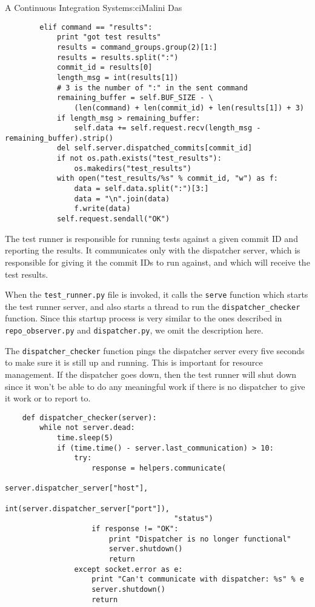 \begin{aosachapter}{A Continuous Integration System}{s:ci}{Malini Das}
\begin{verbatim}
        elif command == "results":
            print "got test results"
            results = command_groups.group(2)[1:]
            results = results.split(":")
            commit_id = results[0]
            length_msg = int(results[1])
            # 3 is the number of ":" in the sent command
            remaining_buffer = self.BUF_SIZE - \
                (len(command) + len(commit_id) + len(results[1]) + 3)
            if length_msg > remaining_buffer:
                self.data += self.request.recv(length_msg - remaining_buffer).strip()
            del self.server.dispatched_commits[commit_id]
            if not os.path.exists("test_results"):
                os.makedirs("test_results")
            with open("test_results/%s" % commit_id, "w") as f:
                data = self.data.split(":")[3:]
                data = "\n".join(data)
                f.write(data)
            self.request.sendall("OK")
\end{verbatim}

\label{the-test-runner-testux5frunner.py}

The test runner is responsible for running tests against a given commit
ID and reporting the results. It communicates only with the dispatcher
server, which is responsible for giving it the commit IDs to run
against, and which will receive the test results.

When the \texttt{test\_runner.py} file is invoked, it calls the
\texttt{serve} function which starts the test runner server, and also
starts a thread to run the \texttt{dispatcher\_checker} function. Since
this startup process is very similar to the ones described in
\texttt{repo\_observer.py} and \texttt{dispatcher.py}, we omit the
description here.

The \texttt{dispatcher\_checker} function pings the dispatcher server
every five seconds to make sure it is still up and running. This is
important for resource management. If the dispatcher goes down, then the
test runner will shut down since it won't be able to do any meaningful
work if there is no dispatcher to give it work or to report to.

\begin{verbatim}
    def dispatcher_checker(server):
        while not server.dead:
            time.sleep(5)
            if (time.time() - server.last_communication) > 10:
                try:
                    response = helpers.communicate(
                                       server.dispatcher_server["host"],
                                       int(server.dispatcher_server["port"]),
                                       "status")
                    if response != "OK":
                        print "Dispatcher is no longer functional"
                        server.shutdown()
                        return
                except socket.error as e:
                    print "Can't communicate with dispatcher: %s" % e
                    server.shutdown()
                    return
\end{verbatim}


\end{aosachapter}
